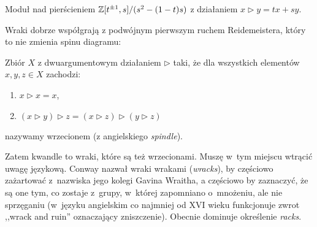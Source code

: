 \begin{example}
    Moduł nad pierścieniem $\mathbb Z[t^{\pm 1}, s]/(s^2 - (1-t)s)$ z działaniem $x \triangleright y = tx+sy$.
\end{example}

Wraki dobrze współgrają z podwójnym pierwszym ruchem Reidemeistera, który to nie zmienia spinu diagramu:
\begin{comment}
\[
    \begin{tikzpicture}[baseline=-0.65ex,scale=0.07]
    \begin{knot}[clip width=5,flip crossing/.list={1}]
        \strand[semithick] (15, 0) [in=up,out=left] to (-5, -7);
        \strand[semithick] (-5, -7) [in=down,out=down] to (5, -7);
        \strand[semithick] (5, -7) [in=right,out=up] to (-15, 0);
        \strand[semithick,Latex-] (45, 0) [in=up,out=left] to (25, -7);
        \strand[semithick] (25, -7) [in=down,out=down] to (35, -7);
        \strand[semithick] (35, -7) [in=right,out=up] to (15, 0);
        \node[darkblue] at (-15, 0)[left] {$x$};
        \node[darkblue] at (15, 0)[above] {$x \triangleright x$};
        \node[darkblue] at (45, 0)[right] {$x$};
    \end{knot}
    \end{tikzpicture}
    \cong
    \begin{tikzpicture}[baseline=-0.65ex,scale=0.07]
    \begin{knot}[clip width=5]
        \strand[semithick,-Latex] (-15, 0) to (15, 0);
        \node[darkblue] at (-15, 0)[left] {$x$};
    \end{knot}
    \end{tikzpicture}
\]
\end{comment}

\begin{definition}[wrzeciono]
    Zbiór $X$ z dwuargumentowym działaniem $\triangleright$ taki, że dla wszystkich elementów $x, y, z \in X$ zachodzi:
    \begin{enumerate}
        \item $x \triangleright x = x$,
        \item $(x \triangleright y) \triangleright z = (x \triangleright z) \triangleright (y \triangleright z)$
    \end{enumerate}
    nazywamy wrzecionem (z angielskiego \emph{spindle}).
\end{definition}

Zatem kwandle to wraki, które są też wrzecionami.
Muszę w~tym miejscu wtrącić uwagę językową.
Conway nazwał wraki wrakami (\emph{wracks}), by częściowo zażartować z~nazwiska jego kolegi Gavina Wraitha, a częściowo by zaznaczyć, że są one tym, co zostaje z~grupy, w~której zapomniano o~mnożeniu, ale nie sprzęganiu (w~języku angielskim co najmniej od XVI wieku funkcjonuje zwrot ,,wrack and ruin'' oznaczający zniszczenie).
Obecnie dominuje określenie \emph{racks}.

